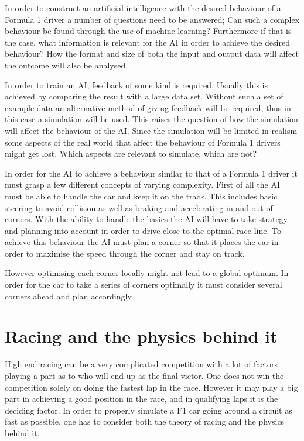 \iffalse
In order to construct an artificial intelligence with the desired behaviour of a Formula 1 driver a number of questions need to be answered; Can such a complex behaviour be found through the use of machine learning? Furthermore if that is the case, what information is relevant for the AI in order to achieve the desired behaviour? How the format and size of both the input and output data will affect the outcome will also be analysed.

In order to train an AI, feedback of some kind is required. Usually this is achieved by comparing the result with a large data set. Without such a set of example data an alternative method of giving feedback will be required, thus in this case a simulation will be used. This raises the question of how the simulation will affect the behaviour of the AI. Since the simulation will be limited in realism some aspects of the real world that affect the behaviour of Formula 1 drivers might get lost. Which aspects are relevant to simulate, which are not?

In order for the AI to achieve a behaviour similar to that of a Formula 1 driver it must grasp a few different concepts of varying complexity. First of all the AI must be able to handle the car and keep it on the track. This includes basic steering to avoid collision as well as braking and accelerating in and out of corners. With the ability to handle the basics the AI will have to take strategy and planning into account in order to drive close to the optimal race line. To achieve this behaviour the AI must plan a corner so that it places the car in order to maximise the speed through the corner and stay on track.

However optimising each corner locally might not lead to a global optimum. In order for the car to take a series of corners optimally it must consider several corners ahead and plan accordingly. 

\section{Racing and the physics behind it}
High end racing can be a very complicated competition with a lot of factors playing a part as to who will end up as the final victor. One does not win the competition solely on doing the fastest lap in the race. However it may play a big part in achieving a good position in the race, and in qualifying laps it is the deciding factor. In order to properly simulate a F1 car going around a circuit as fast as possible, one has to consider both the theory of racing and the physics behind it.

